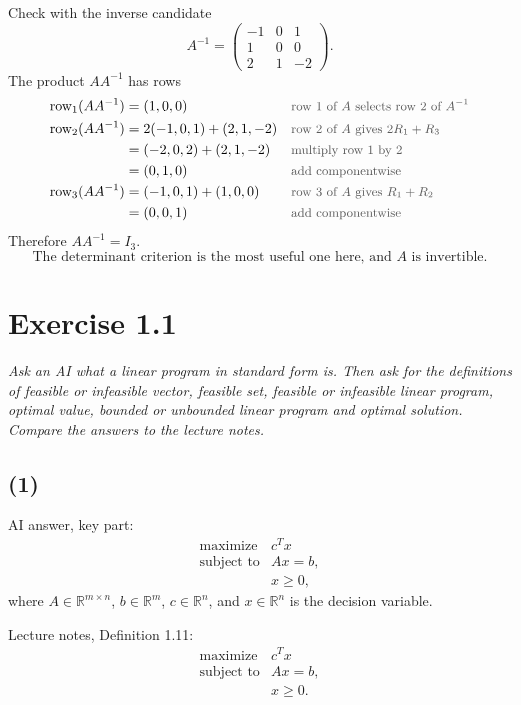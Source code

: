 \documentclass[a4paper,11pt]{article}
\newif\ifexplain
\newcommand{\aufgabe}[1]{\section*{#1}}
\newcommand{\angabe}[1]{\textit{#1}\par\smallskip}
\newcommand{\teil}[1]{\subsection*{(#1)}}
\newcommand{\why}[1]{\text{\small\color{black!65}#1}}
\newcommand{\explain}[1]{\ifexplain\begin{erklbox}#1\end{erklbox}\fi}
\begin{document}
Check with the inverse candidate
\[
A^{-1}=\begin{pmatrix}-1&0&1\\1&0&0\\2&1&-2\end{pmatrix}.
\]
The product $AA^{-1}$ has rows
\begin{align*}
\text{row}_1(AA^{-1})&=(1,0,0) && \why{row $1$ of $A$ selects row $2$ of $A^{-1}$}\\
\text{row}_2(AA^{-1})&=2(-1,0,1)+(2,1,-2) && \why{row $2$ of $A$ gives $2R_1+R_3$}\\
&=(-2,0,2)+(2,1,-2) && \why{multiply row $1$ by $2$}\\
&=(0,1,0) && \why{add componentwise}\\
\text{row}_3(AA^{-1})&=(-1,0,1)+(1,0,0) && \why{row $3$ of $A$ gives $R_1+R_2$}\\
&=(0,0,1) && \why{add componentwise}
\end{align*}
Therefore $AA^{-1}=I_3$.
\[
\boxed{\text{The determinant criterion is the most useful one here, and }A\text{ is invertible.}}
\]

\aufgabe{Exercise 1.1}
\angabe{Ask an AI what a linear program in standard form is. Then ask for the definitions of feasible or infeasible vector, feasible set, feasible or infeasible linear program, optimal value, bounded or unbounded linear program and optimal solution. Compare the answers to the lecture notes.}
\explain{Die Vorlesung verwendet eine Maximierungsform mit Gleichungsnebenbedingungen und Nichtnegativität. Andere Bücher benutzen manchmal eine Minimierungsform oder Ungleichungen. Wichtig ist hier der Abgleich mit genau der Vorlesungsdefinition.}

\teil{1}
AI answer, key part:
\[
\begin{array}{ll}
\text{maximize} & c^Tx\\
\text{subject to} & Ax=b,\\
& x\ge 0,
\end{array}
\]
where $A\in\mathbb R^{m\times n}$, $b\in\mathbb R^m$, $c\in\mathbb R^n$, and $x\in\mathbb R^n$ is the decision variable.

Lecture notes, Definition 1.11:
\[
\begin{array}{ll}
\text{maximize} & c^Tx\\
\text{subject to} & Ax=b,\\
& x\ge 0.
\end{array}
\]
\explain{Hier stimmen Zielfunktionsrichtung, Gleichung $Ax=b$ und Nichtnegativität $x\ge0$ überein. Genau diese drei Punkte bestimmen die Standardform im Skript.}
\end{document}
